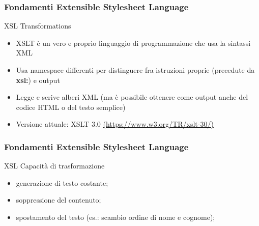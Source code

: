 \begin{frame}
    \frametitle{Fondamenti Extensible Stylesheet Language}
    \addtocounter{nframe}{1}
    

     \begin{block}{XSL Transformations}
         \begin{itemize}
            \item XSLT è un vero e proprio linguaggio di programmazione che usa la sintassi XML
            \item Usa namespace differenti per distinguere fra istruzioni proprie (precedute da \textbf{xsl:}) e output
            \item Legge e scrive alberi XML (ma è possibile ottenere come output anche del
            codice HTML o del testo semplice)
            \item Versione attuale: XSLT 3.0 \url{(https://www.w3.org/TR/xslt-30/)}
        \end{itemize}
     \end{block}
    
\end{frame}

\begin{frame}
    \frametitle{Fondamenti Extensible Stylesheet Language}
    \addtocounter{nframe}{1}
    

     \begin{block}{XSL Capacità di trasformazione}
         \begin{itemize}
            \item generazione di testo costante;
            \item soppressione del contenuto;
            \item spostamento del testo (es.: scambio ordine di nome e cognome);
        \end{itemize}
     \end{block}
    
\end{frame}

